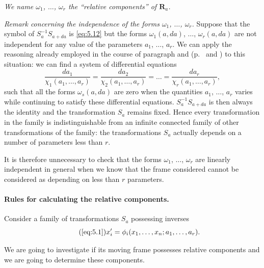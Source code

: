 \emph{We name $\omega_{1}$, $\dots$, $\omega_{r}$ the ``relative components'' of $\mathbf{R}_{a}$.}

\somespace

\emph{Remark concerning the independence of the forms $\omega_{1}$, $\dots$, $\omega_{r}$.} Suppose that the symbol of $S_{a}^{-1}S_{a+da}$ is \eqref{eq:5.12} but the forms $\omega_{1}(a,da)$, $\dots$, $\omega_{r}(a,da)$ are not independent for any value of the parameters $a_{1}$, $\dots$, $a_{r}$. We can apply the reasoning already employed in the course of paragraph  and  (p.~\pageref{sec:8} and \pageref{sec:25}) to this situation: we can find a system of differential equations
\[
\frac{da_{1}}{\chi_{1}(a_{1},\dots,a_{r})}=
\frac{da_{2}}{\chi_{2}(a_{1},\dots,a_{r})}=\dots=
\frac{da_{r}}{\chi_{r}(a_{1},\dots,a_{r})},
\]
such that all the forms $\omega_{s}(a,da)$ are zero when the quantities $a_{1}$, $\dots$, $a_{r}$ varies while continuing to satisfy these differential equations. $S_{a}^{-1}S_{a+da}$ is then always the identity and the transformation $S_{a}$ remains fixed. Hence every transformation in the family is indistinguishable from an infinite connected family of other transformations of the family: the transformations $S_{a}$ actually depends on a number of parameters less than $r$.

It is therefore unnecessary to check that the forms $\omega_{1}$, $\dots$, $\omega_{r}$ are linearly independent in general when we know that the frame considered cannot be considered as depending on less than $r$ parameters. 

\paragraph{Rules for calculating the relative components.}
\label{sec:71}
Consider a family of transformations $S_{a}$ possessing inverses
\begin{equation}
  \label{eq:5.1'}\tag{\ref{eq:5.1}}
  x'_{i}=\phi_{i}(x_{1},\dots,x_{n};a_{1},\dots,a_{r}).
\end{equation}

We are going to investigate if its moving frame possesses relative components and we are going to determine these components.

